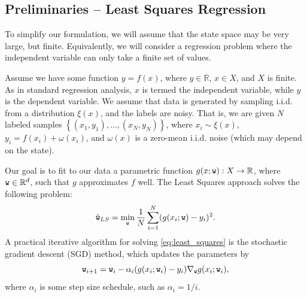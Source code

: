 

\subsection{Preliminaries -- Least Squares Regression}
To simplify our formulation, we will assume that the state space may be very large, but finite. Equivalently, we will consider a regression problem where the independent variable can only take a finite set of values. 

Assume we have some function $y = f(x)$, where $y \in \mathbb{R}$, $x\in X$, and $X$ is finite. As in standard regression analysis, $x$ is termed the independent variable, while $y$ is the dependent variable. We assume that data is generated by sampling i.i.d. from a distribution $\xi(x)$, and the labels are noisy. That is, we are given $N$ labeled samples $\left\{(x_1, y_1),\dots, (x_N, y_N) \right\}$, where $x_i \sim \xi(x)$, $y_i = f(x_i) + \omega(x_i)$, and $\omega(x)$ is a zero-mean i.i.d. noise (which may depend on the state).

Our goal is to fit to our data a parametric function $g(x;{\tt w}):X \to \mathbb{R}$, where ${\tt w} \in \mathbb{R}^{d}$, such that $g$ approximates $f$ well. The Least Squares approach solves the following problem:
\begin{equation}\label{eq:least_squares}
\hat{{\tt w}}_{LS} = \min_{\tt w} \frac{1}{N}\sum_{i=1}^N (g(x_i;{\tt w}) - y_i)^2.
\end{equation}
A practical iterative algorithm for solving \eqref{eq:least_squares} is the stochastic gradient descent (SGD) method, which updates the parameters by
\begin{equation}\label{eq:sgd}
{\tt w}_{i+1} = {\tt w}_i - \alpha_i (g(x_i;{\tt w}_i) - y_i)\nabla_{\tt w} g(x_i;{\tt w}_i),
\end{equation}
where $\alpha_i$ is some step size schedule, such as $\alpha_i = 1/i$.



